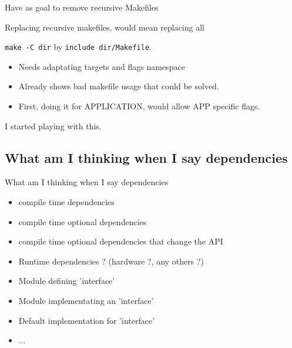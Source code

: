 \documentclass[ucs,9pt]{beamer}
\begin{document}
\begin{frame}{Have as goal to remove recursive Makefiles}

  Replacing recursive makefiles, would mean replacing all

  \smallskip
  \texttt{make -C dir} by \texttt{include dir/Makefile}.

  \pause
  \begin{itemize}
    \item
      Needs adaptating targets and flags namespace

    \item
      Already shows bad makefile usage that could be solved.

    \item
      First, doing it for APPLICATION, would allow APP specific flags.
  \end{itemize}

  \pause
  I started playing with this.

\end{frame}


\subsection{What am I thinking when I say dependencies}

\begin{frame}{What am I thinking when I say dependencies}

  \begin{itemize}
    \item
      compile time dependencies

    \item
      compile time optional dependencies
    \item
      compile time optional dependencies that change the API

    \pause \smallskip

    \item
      Runtime dependencies ? (hardware ?, any others ?)

    \pause \smallskip

    \item
      Module defining 'interface'
    \item
      Module implementating an 'interface'

    \item
      Default implementation for 'interface'

    \smallskip

    \item
      ...
  \end{itemize}

\end{frame}
\end{document}
